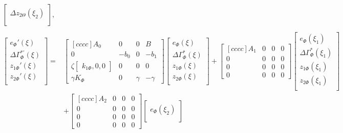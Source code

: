 \documentclass[main.tex]{subfiles}
\begin{document}
\begin{align}
\begin{bmatrix}
	\Delta z_{2\Theta}(\xi_2) \\
	\end{bmatrix}, \label{eq:SynthesisConInc}\\
	\nonumber\\
	\begin{bmatrix}
	e_\Phi'(\xi) \\
	\Delta \Gamma_\Phi^{*'}(\xi) \\
	z_{1\Phi}'(\xi) \\
	z_{2\Phi}'(\xi) \\
	\end{bmatrix} =& 
	\begin{bmatrix}[cccc]
	A_0 & 0 & 0 & B\\
	0 & -b_0 & 0 & -b_1\\
	\zeta \begin{bmatrix}k_{1\Phi} , 0 , 0\end{bmatrix} & 0 & 0 & 0\\
	\gamma K_\Phi & 0 & \gamma & -\gamma
	\end{bmatrix}
	\begin{bmatrix}
	e_\Phi(\xi) \\
	\Delta \Gamma_\Phi^{*}(\xi) \\
	z_{1\Phi}(\xi) \\
	z_{2\Phi}(\xi) \\
	\end{bmatrix} + 
	\begin{bmatrix}[cccc]
	A_1 & 0 & 0 & 0\\
	0 & 0 & 0 & 0\\
	0 & 0 & 0 & 0\\
	0 & 0 & 0 & 0 
	\end{bmatrix}
	\begin{bmatrix}
	e_\Phi(\xi_1) \\
	\Delta \Gamma_\Phi^{*}(\xi_1) \\
	z_{1\Phi}(\xi_1) \\
	z_{2\Phi}(\xi_1) \\
	\end{bmatrix} \nonumber\\
	&+ 
	\begin{bmatrix}[cccc]
	A_2 & 0 & 0 & 0\\
	0 & 0 & 0 & 0\\
	0 & 0 & 0 & 0\\
	0 & 0 & 0 & 0 
	\end{bmatrix}
	\begin{bmatrix}
	e_\Phi(\xi_2) \\

\end{bmatrix}
\end{align}
\end{document}
